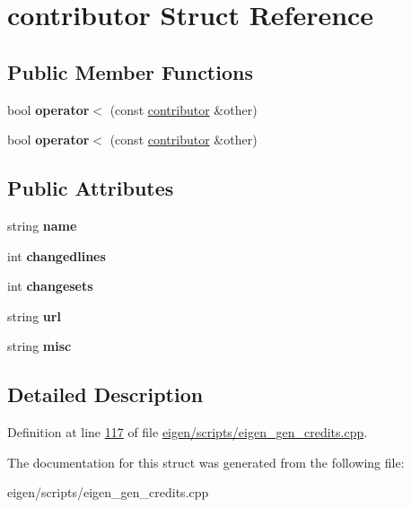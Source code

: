 \hypertarget{structcontributor}{}\section{contributor Struct Reference}
\label{structcontributor}
\subsection*{Public Member Functions}
\begin{DoxyCompactItemize}
\item 
\mbox{\label{structcontributor_a2b039056e72b4a87106f0986fac2e7c2}} 
bool {\bfseries operator$<$} (const \hyperlink{structcontributor}{contributor} \&other)
\item 
\mbox{\label{structcontributor_a2b039056e72b4a87106f0986fac2e7c2}} 
bool {\bfseries operator$<$} (const \hyperlink{structcontributor}{contributor} \&other)
\end{DoxyCompactItemize}
\subsection*{Public Attributes}
\begin{DoxyCompactItemize}
\item 
\mbox{\label{structcontributor_a6e35658a930762dfc7b68f7ee2be09c8}} 
string {\bfseries name}
\item 
\mbox{\label{structcontributor_a566499dd20ecedf1c9af3bb945d1e9fc}} 
int {\bfseries changedlines}
\item 
\mbox{\label{structcontributor_a197481a8a78c383d63782eb660fcfe2a}} 
int {\bfseries changesets}
\item 
\mbox{\label{structcontributor_abf9463999f5581857e55506f3e8e27c2}} 
string {\bfseries url}
\item 
\mbox{\label{structcontributor_acd949317c5481f807b5fcb0c2f38b324}} 
string {\bfseries misc}
\end{DoxyCompactItemize}


\subsection{Detailed Description}


Definition at line \hyperlink{eigen_2scripts_2eigen__gen__credits_8cpp_source_l00117}{117} of file \hyperlink{eigen_2scripts_2eigen__gen__credits_8cpp_source}{eigen/scripts/eigen\+\_\+gen\+\_\+credits.\+cpp}.



The documentation for this struct was generated from the following file\+:\begin{DoxyCompactItemize}
\item 
eigen/scripts/eigen\+\_\+gen\+\_\+credits.\+cpp\end{DoxyCompactItemize}
